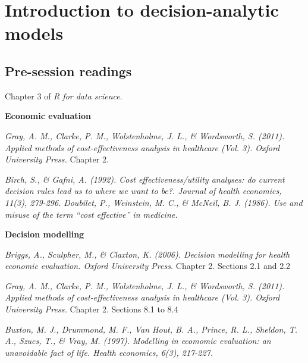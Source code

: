 \documentclass[
]{book}
\begin{document}
\hypertarget{decision}{%
\chapter{Introduction to decision-analytic models}\label{decision}}

\hypertarget{pre-session-readings-1}{%
\section{Pre-session readings}\label{pre-session-readings-1}}

Chapter 3 of \emph{R for data science}.

\textbf{Economic evaluation}

\emph{Gray, A. M., Clarke, P. M., Wolstenholme, J. L., \& Wordsworth, S. (2011). Applied methods of cost-effectiveness analysis in healthcare (Vol. 3). Oxford University Press.} Chapter 2.

\emph{Birch, S., \& Gafni, A. (1992). Cost effectiveness/utility analyses: do current decision rules lead us to where we want to be?. Journal of health economics, 11(3), 279-296.}
\emph{Doubilet, P., Weinstein, M. C., \& McNeil, B. J. (1986). Use and misuse of the term ``cost effective'' in medicine.}

\textbf{Decision modelling}

\emph{Briggs, A., Sculpher, M., \& Claxton, K. (2006). Decision modelling for health economic evaluation. Oxford University Press.} Chapter 2. Sections 2.1 and 2.2

\emph{Gray, A. M., Clarke, P. M., Wolstenholme, J. L., \& Wordsworth, S. (2011). Applied methods of cost-effectiveness analysis in healthcare (Vol. 3). Oxford University Press.} Chapter 2. Sections 8.1 to 8.4

\emph{Buxton, M. J., Drummond, M. F., Van Hout, B. A., Prince, R. L., Sheldon, T. A., Szucs, T., \& Vray, M. (1997). Modelling in ecomomic evaluation: an unavoidable fact of life. Health economics, 6(3), 217-227.}

  
\end{document}
